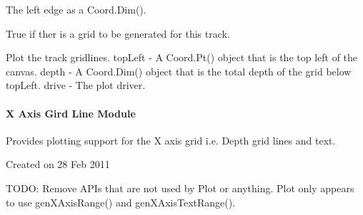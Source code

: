 \documentclass[letterpaper,10pt,english]{sphinxmanual}
\begin{document}
\begin{fulllineitems}
\begin{fulllineitems}
\end{fulllineitems}


\begin{fulllineitems}
\label{\detokenize{ref/util/plot/Track:TotalDepth.util.plot.Track.Track.right}}
The left edge as a Coord.Dim().

\end{fulllineitems}


\begin{fulllineitems}
\label{\detokenize{ref/util/plot/Track:TotalDepth.util.plot.Track.Track.hasGrid}}
True if ther is a grid to be generated for this track.

\end{fulllineitems}


\begin{fulllineitems}
\label{\detokenize{ref/util/plot/Track:TotalDepth.util.plot.Track.Track.plotSVG}}
Plot the track gridlines.
topLeft - A Coord.Pt() object that is the top left of the canvas.
depth - A Coord.Dim() object that is the total depth of the grid below topLeft.
drive - The plot driver.

\end{fulllineitems}


\end{fulllineitems}



\paragraph{X Axis Gird Line Module}
\label{\detokenize{ref/util/plot/XGrid:x-axis-gird-line-module}}\label{\detokenize{ref/util/plot/XGrid::doc}}\label{\detokenize{ref/util/plot/XGrid:module-TotalDepth.util.plot.XGrid}}
Provides plotting support for the X axis grid i.e. Depth grid lines and text.

Created on 28 Feb 2011

TODO: Remove APIs that are not used by Plot or anything. Plot only appears to
use genXAxisRange() and genXAxisTextRange().
\end{document}
